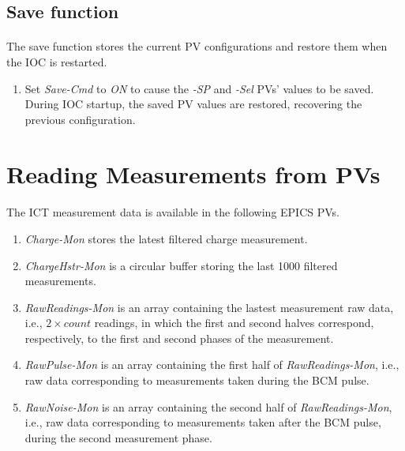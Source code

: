 \documentclass[openany]{article}
\begin{document}
	\subsection{Save function}

		\paragraph{} The save function stores the current PV configurations and restore them when the IOC is restarted.

			\begin{enumerate}
				\item Set \emph{Save-Cmd} to \emph{ON} to cause the \emph{-SP} and \emph{-Sel} PVs' values to be saved. During IOC startup, the saved PV values are restored, recovering the previous configuration.
			\end{enumerate}

\section{Reading Measurements from PVs}

	\paragraph{} The ICT measurement data is available in the following EPICS PVs.

		\begin{enumerate}
			\item \emph{Charge-Mon} stores the latest filtered charge measurement.
			\item \emph{ChargeHstr-Mon} is a circular buffer storing the last 1000 filtered measurements.
			\item \emph{RawReadings-Mon} is an array containing the lastest measurement raw data, i.e., $ 2 \times count $ readings, in which the first and second halves correspond, respectively, to the first and second phases of the measurement.
			\item \emph{RawPulse-Mon} is an array containing the first half of \emph{RawReadings-Mon}, i.e., raw data corresponding to measurements taken during the BCM pulse.
			\item \emph{RawNoise-Mon} is an array containing the second half of \emph{RawReadings-Mon}, i.e., raw data corresponding to measurements taken after the BCM pulse, during the second measurement phase.
		\end{enumerate}
\end{document}
